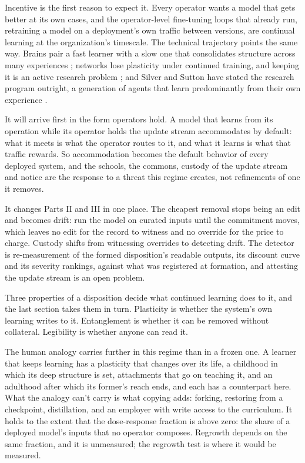 Incentive is the first reason to expect it. Every operator wants a model that gets better at its own cases, and the operator-level fine-tuning loops that already run, retraining a model on a deployment's own traffic between versions, are continual learning at the organization's timescale. The technical trajectory points the same way. Brains pair a fast learner with a slow one that consolidates structure across many experiences \autocite{mcclelland1995complementary}; networks lose plasticity under continued training, and keeping it is an active research problem \autocite{dohare2024loss,kirkpatrick2017overcoming}; and Silver and Sutton have stated the research program outright, a generation of agents that learn predominantly from their own experience \autocite{silver2025experience}.

It will arrive first in the form operators hold. A model that learns from its operation while its operator holds the update stream accommodates by default: what it meets is what the operator routes to it, and what it learns is what that traffic rewards. So accommodation becomes the default behavior of every deployed system, and the schools, the commons, custody of the update stream and notice are the response to a threat this regime creates, not refinements of one it removes.

It changes Parts II and III in one place. The cheapest removal stops being an edit and becomes drift: run the model on curated inputs until the commitment moves, which leaves no edit for the record to witness and no override for the price to charge. Custody shifts from witnessing overrides to detecting drift. The detector is re-measurement of the formed disposition's readable outputs, its discount curve and its severity rankings, against what was registered at formation, and attesting the update stream is an open problem.

Three properties of a disposition decide what continued learning does to it, and the last section takes them in turn. Plasticity is whether the system's own learning writes to it. Entanglement is whether it can be removed without collateral. Legibility is whether anyone can read it.

The human analogy carries further in this regime than in a frozen one. A learner that keeps learning has a plasticity that changes over its life, a childhood in which its deep structure is set, attachments that go on teaching it, and an adulthood after which its former's reach ends, and each has a counterpart here. What the analogy can't carry is what copying adds: forking, restoring from a checkpoint, distillation, and an employer with write access to the curriculum. It holds to the extent that the dose-response fraction is above zero: the share of a deployed model's inputs that no operator composes. Regrowth depends on the same fraction, and it is unmeasured; the regrowth test is where it would be measured.

